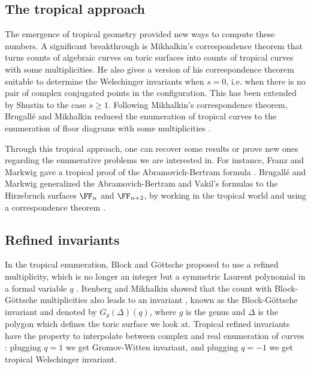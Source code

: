 \subsection{The tropical approach} \label{sec-trop-enumgeom}

The emergence of tropical geometry provided new ways to compute these numbers. A significant breakthrough is Mikhalkin's correspondence theorem \cite{mikhalkin_enumerative_2005} that turns counts of algebraic curves on toric surfaces into counts of tropical curves with some multiplicities. He also gives a version of his correspondence theorem suitable to determine the Welschinger invariants when $s=0$, i.e.  when there is no pair of complex conjugated points in the configuration. This has been extended by Shustin \cite{shustin-2006-tropical} to the case $s\geqslant1$.
Following Mikhalkin's correspondence theorem, Brugallé and Mikhalkin reduced the enumeration of tropical curves to the enumeration of floor diagrams with some multiplicities \cite{brugalle_enumeration_2007, brugalle_floor_2008}.

Through this tropical approach, one can recover some results or prove new ones regarding the enumerative problems we are interested in. For instance, Franz and Markwig gave a tropical proof of the Abramovich-Bertram formula \cite{franz-2011-tropical}. 
Brugallé and Markwig generalized the Abramovich-Bertram and Vakil's formulas to the Hirzebruch surfaces $\FF_n$ and $\FF_{n+2}$, by working in the tropical world and using a correspondence theorem \cite{brugalle-2016-deformation}. 



\subsection{Refined invariants}


In the tropical enumeration, Block and Göttsche proposed to use a refined multiplicity, which is no longer an integer but a symmetric Laurent polynomial in a formal variable $q$ \cite{block_refined_2016}. Itenberg and Mikhalkin showed that the count with Block-Göttsche multiplicities also leads to an invariant \cite{itenberg_block-gottsche_2013}, known as the Block-Göttsche invariant and denoted by $G_g(\Delta)(q)$, where $g$ is the genus and $\Delta$ is the polygon which defines the toric surface we look at. Tropical refined invariants have the property to interpolate between complex and real enumeration of curves : plugging $q=1$ we get Gromov-Witten invariant, and plugging $q=-1$ we get tropical Welschinger invariant.



